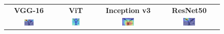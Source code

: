 \documentclass[a4paper,12pt]{report}
\begin{document}
\begin{figure}[H]
    \centering
    \setlength{\tabcolsep}{1pt}
    \begin{tabular}{cccc}
    \textbf{VGG-16} & \textbf{ViT} & \textbf{Inception v3} & \textbf{ResNet50} \\
    
    \includegraphics[width=0.22\textwidth]{images/appendix/modelgraph/vgg/correct/Slaty_Backed_Gull/480 (19).jpeg} &
    \includegraphics[width=0.22\textwidth]{images/appendix/modelgraph/vit/correct/Slaty_Backed_Gull/480 (19).jpeg} &
    \includegraphics[width=0.22\textwidth]{images/appendix/modelgraph/inception/correct/Slaty_Backed_Gull/480 (19).jpeg} &
    \includegraphics[width=0.22\textwidth]{images/appendix/modelgraph/resnet/correct/Slaty_Backed_Gull/480 (19).jpeg} \\
    \end{tabular}

    \label{fig:interpretability_slaty_7}
\end{figure}
\end{document}

